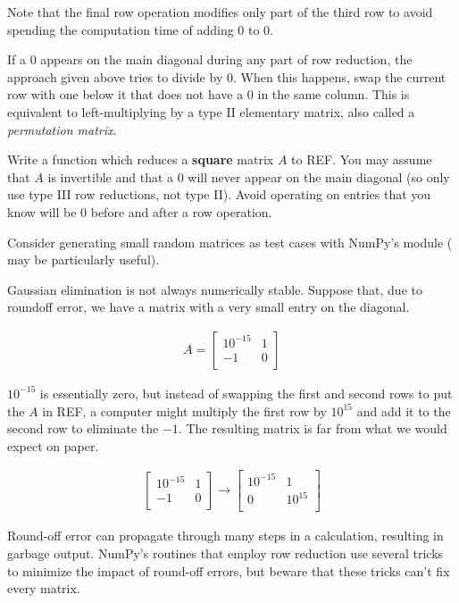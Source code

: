 Note that the final row operation modifies only part of the third row to avoid spending the computation time of adding $0$ to $0$.

If a $0$ appears on the main diagonal during any part of row reduction, the approach given above tries to divide by $0$.
When this happens, swap the current row with one below it that does not have a $0$ in the same column.
This is equivalent to left-multiplying by a type II elementary matrix, also called a \emph{permutation matrix}.

\begin{problem} %
Write a function which reduces a \textbf{square} matrix $A$ to REF.
You may assume that $A$ is invertible and that a $0$ will never appear on the main diagonal (so only use type III row reductions, not type II).
Avoid operating on entries that you know will be $0$ before and after a row operation.

Consider generating small random matrices as test cases with NumPy's  module ( may be particularly useful).
\label{prob:ref-row-reduction}
\end{problem}

\begin{warn} %
Gaussian elimination is not always numerically stable.
Suppose that, due to roundoff error, we have a matrix with a very small entry on the diagonal.

\begin{align*}
A = \left[\begin{array}{cc}
10^{-15} & 1 \\
-1 & 0 \\
\end{array}\right]
\end{align*}

$10^{-15}$ is essentially zero, but instead of swapping the first and second rows to put the $A$ in REF, a computer might multiply the first row by $10^{15}$ and add it to the second row to eliminate the $-1$.
The resulting matrix is far from what we would expect on paper.

\begin{align*}
\left[\begin{array}{cc}
10^{-15} & 1 \\
-1 & 0 \\
\end{array}\right]
\longrightarrow
\left[\begin{array}{cc}
10^{-15} & 1 \\
0 & 10^{15} \\
\end{array}\right]
\end{align*}

Round-off error can propagate through many steps in a calculation, resulting in garbage output.
NumPy's routines that employ row reduction use several tricks to minimize the impact of round-off errors, but beware that these tricks can't fix every matrix.
\end{warn}

